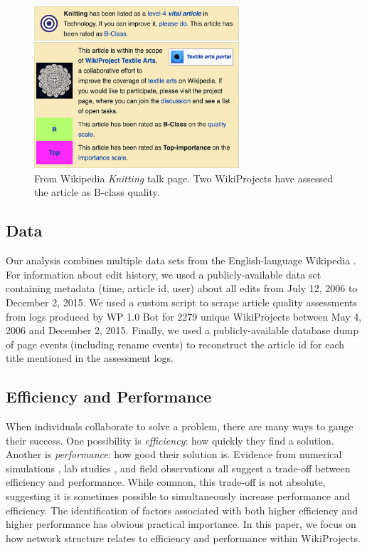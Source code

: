 \begin{figure}[h!]
\begin{center}
\includegraphics[width=3in]{fig-knitting.png}
\caption{
From Wikipedia {\em Knitting} talk page.
Two WikiProjects have assessed the article as B-class quality.
\label{fig:knitting}
}
\end{center}
\end{figure}

\subsection{Data}

Our analysis combines multiple data
sets from the English-language Wikipedia \cite{platt_english_2018}.
For information about edit history, we used a publicly-available data set containing
metadata (time, article id, user) about all edits from July 12, 2006 to December 2, 2015.
We used a custom script to scrape article quality assessments from logs produced
by WP 1.0 Bot for 2279 unique WikiProjects
between May 4, 2006 and December 2, 2015.
Finally, we used a publicly-available database dump of page events (including rename events)
to reconstruct the article id for each title mentioned in the assessment logs.

\subsection{Efficiency and Performance}

When individuals collaborate to solve a problem,
there are many ways to gauge their success.
One possibility is {\em efficiency}:
how quickly they find a solution.
Another is {\em performance}:
how good their solution is.
Evidence from numerical simulations
\cite{lazer_network_2007,mason_propagation_2008,mason_collaborative_2012,grim_scientific_2013,barkoczi_social_2016},
lab studies \cite{kearns_experiments_2012},
and field observations \cite{gentry_consensus_1982}
all suggest a trade-off between efficiency and performance.
While common, this trade-off is not absolute,
suggesting it is sometimes possible to simultaneously increase
performance and efficiency.
The identification of factors associated with both higher efficiency
and higher performance has obvious practical importance.
In this paper, we focus on how network structure
relates to efficiency and performance within WikiProjects.

